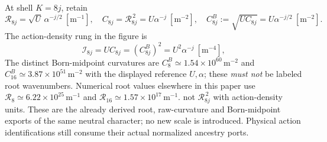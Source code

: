 \documentclass[12pt,a4paper]{article}
\begin{document}
\begin{remark}
\label{p8:rem:v2211-hierarchy-units}
At shell $K=8j$, retain
\[
 \mathcal R_{8j}=\sqrt U\,\alpha^{-j/2}\ [\mathrm m^{-1}],\quad
 C_{8j}=\mathcal R_{8j}^{\,2}=U\alpha^{-j}\ [\mathrm m^{-2}],\quad
 C^B_{8j}:=\sqrt{UC_{8j}}=U\alpha^{-j/2}\ [\mathrm m^{-2}].
\]
The action-density rung in the figure is
\[
 \mathcal I_{8j}=UC_{8j}=(C^B_{8j})^2
 =U^2\alpha^{-j}\ [\mathrm m^{-4}],
\]
The distinct Born-midpoint curvatures are
\(C^B_8\simeq1.54\times10^{60}\,\mathrm m^{-2}\) and
\(C^B_{16}\simeq3.87\times10^{51}\,\mathrm m^{-2}\)
with the displayed reference \(U,\alpha\); these \emph{must not} be labeled
root wavenumbers. Numerical root values elsewhere in this paper use
\(\mathcal R_8\simeq6.22\times10^{25}\,\mathrm m^{-1}\) and
\(\mathcal R_{16}\simeq1.57\times10^{17}\,\mathrm m^{-1}\).
not $\mathcal R_{8j}^{\,2}$ with action-density units. These are the
already derived root, raw-curvature and Born-midpoint exports of the
same neutral character; no new scale is introduced. Physical action
identifications still consume their actual normalized ancestry ports.
\end{remark}
\end{document}
